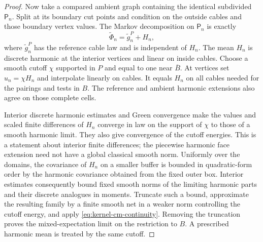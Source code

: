 \begin{proof}
Now take a compared ambient graph containing the identical subdivided
\(\mathsf P_n\). Split at its boundary cut points and condition on
the outside cables and those boundary vertex values. The Markov
decomposition on \(\mathsf P_n\) is exactly
\[
              \widetilde\Phi_n=\widetilde g_n^P+H_n,
\]
where \(\widetilde g_n^P\) has the reference cable law
and is independent of \(H_n\). The mean \(H_n\) is discrete harmonic
at the interior vertices and linear on inside cables. Choose a smooth
cutoff \(\chi\) supported in \(P\) and equal to one near \(\overline B\).
At vertices set \(u_n=\chi H_n\) and interpolate linearly on cables.
It equals \(H_n\) on all cables needed for the pairings and tests in
\(B\). The reference and ambient harmonic extensions also agree on
those complete cells.

Interior discrete harmonic estimates and Green convergence make the
values and scaled finite differences of \(H_n\) converge in law on the
support of \(\chi\) to those of a smooth harmonic limit. They also
give convergence of the cutoff energies. This is a statement about
interior finite differences; the piecewise harmonic face extension
need not have a global classical smooth norm. Uniformly over the
domains, the covariance of \(H_n\) on a smaller buffer is bounded
in quadratic-form order by the harmonic covariance obtained from the
fixed outer box. Interior estimates consequently bound fixed smooth
norms of the limiting harmonic parts and their discrete analogues in
moments. Truncate such a bound, approximate the resulting family by a
finite smooth net in a weaker norm controlling the cutoff energy, and
apply \eqref{eq:kernel-cm-continuity}. Removing the truncation proves
the mixed-expectation limit on the restriction to \(B\). A prescribed
harmonic mean is treated by the same cutoff.


\end{proof}
